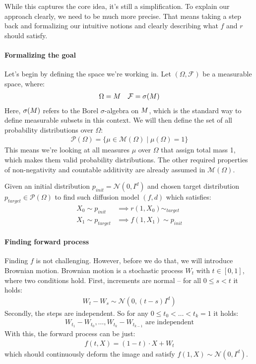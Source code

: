 While this captures the core idea, it’s still a simplification. To explain our approach clearly, we need to be much more precise. That means taking a step back and formalizing our intuitive notions and clearly describing what $f$ and $r$ should satisfy.

\paragraph{Formalizing the goal}

Let’s begin by defining the space we’re working in. Let $(\Omega, \mathcal{F})$ be a measurable space, where:
\begin{align*}
    \Omega = M \quad \mathcal{F} = \sigma(M)
\end{align*}
Here, $\sigma(M)$ refers to the Borel $\sigma$-algebra on $M$, which is the standard way to define measurable subsets in this context. We will then define the set of all probability distributions over $\Omega$:
\begin{align*}
    \mathcal{P}(\Omega) = \{ \mu \in \mathcal{M}(\Omega) \mid \mu(\Omega) = 1 \}
\end{align*}
This means we’re looking at all measures $\mu$ over $\Omega$ that assign total mass 1, which makes them valid probability distributions. The other required properties of non-negativity and countable additivity are already assumed in $\mathcal{M}(\Omega)$.

Given an initial distribution $p_{init} = \mathcal{N}(0, I^d)$ and chosen target distribution
$p_{target} \in \mathcal{P}(\Omega)$ to find such diffusion model $(f,d)$ which satisfies:
\begin{align*}
    X_0 \sim p_{init} &\implies r(1, X_0) \sim_{target} \\
    X_1 \sim p_{target} &\implies f(1, X_1) \sim p_{init}
\end{align*}

\paragraph{Finding forward process} Finding $f$ is not challenging.
However, before we do that, we will introduce Brownian motion.
Brownian motion is a stochastic process $W_t$ with $t \in [0,1]$,
where two conditions hold. First, increments are normal --
for all $0 \leq s < t$ it holds:
\begin{align*}
    W_t - W_s \sim \mathcal{N}(0, (t-s)I^d)
\end{align*}
Secondly, the steps are independent. So for any $0 \leq t_0 < \dots < t_k = 1$ it holds:
\begin{align*}
    W_{t_1} - W_{t_0}, \dots, W_{t_k} - W_{t_{k-1}} \text{ are independent}
\end{align*}
With this, the forward process can be just:
\begin{align*}
    f (t, X) = (1-t) \cdot X + W_t
\end{align*}
which should continuously deform the image and satisfy $f(1,X) \sim \mathcal{N}(0, I^d)$.

